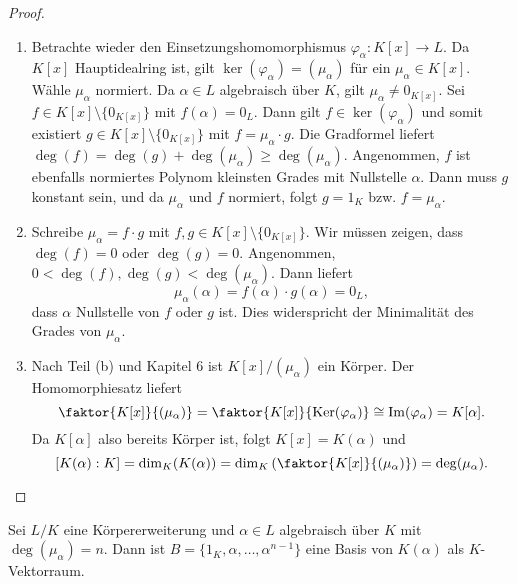 \begin{proof}
	\begin{enumerate}[label=(\alph*)]
		\item Betrachte wieder den Einsetzungshomomorphismus $\varphi_\alpha \colon K[x] \to L$. Da $K[x]$ Hauptidealring ist, gilt $\ker(\varphi_\alpha) = (\mu_\alpha)$ für ein $\mu_\alpha \in K[x]$. Wähle $\mu_\alpha$ normiert. Da $\alpha \in L$ algebraisch über $K$, gilt $\mu_\alpha \neq 0_{K[x]}$. Sei $f \in K[x] \setminus \{0_{K[x]}\}$ mit $f(\alpha) = 0_L$. Dann gilt $f \in \ker(\varphi_\alpha)$ und somit existiert $g \in K[x] \setminus \{0_{K[x]}\}$ mit $f = \mu_\alpha \cdot g$. Die Gradformel liefert $\deg(f) = \deg(g) + \deg(\mu_\alpha) \geq \deg(\mu_\alpha)$. Angenommen, $f$ ist ebenfalls normiertes Polynom kleinsten Grades mit Nullstelle $\alpha$. Dann muss $g$ konstant sein, und da $\mu_\alpha$ und $f$ normiert, folgt $g = 1_K$ bzw. $f = \mu_\alpha$.
		\item Schreibe $\mu_\alpha = f \cdot g$ mit $f,g \in K[x] \setminus \{0_{K[x]}\}$. Wir müssen zeigen, dass $\deg(f) = 0$ oder $\deg(g) = 0$. Angenommen, $ 0 < \deg(f),\deg(g) < \deg(\mu_\alpha)$. Dann liefert 
		\[\mu_\alpha (\alpha) = f(\alpha) \cdot g(\alpha) = 0_L,\]
		dass $\alpha$ Nullstelle von $f$ oder $g$ ist. Dies widerspricht der Minimalität des Grades von $\mu_\alpha$.
		
		\item Nach Teil (b) und Kapitel 6 ist $K[x] / (\mu_\alpha)$ ein Körper. Der Homomorphiesatz liefert
		\[\faktor{K[x]}{(\mu_\alpha)} = \faktor{K[x]}{\ker(\varphi_\alpha)} \cong \im(\varphi_\alpha) = K[\alpha].\]
		Da $K[\alpha]$ also bereits Körper ist, folgt $K[x] = K(\alpha)$ und 
		\[[K(\alpha) : K] = \dim_K(K(\alpha)) = \dim_K\left(\faktor{K[x]}{(\mu_\alpha)}\right) = \deg(\mu_\alpha).\]
	\end{enumerate}
\end{proof}
\begin{kor}\label{kor7_14}
	Sei $L/K$ eine Körpererweiterung und $\alpha \in L$ algebraisch über $K$ mit $\deg(\mu_\alpha) = n$. Dann ist $B = \{1_K, \alpha, \dots, \alpha^{n-1}\}$ eine Basis von $K(\alpha)$ als $K$-Vektorraum.
\end{kor}